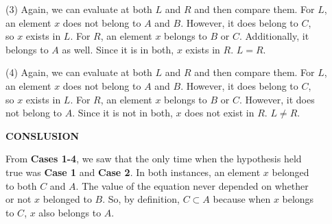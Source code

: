 \documentclass{article}
\begin{document}
\begin{flushleft}
 (3)\:\: Again, we can evaluate at both $L$ and $R$ and then compare them. For $L$, \\
 \qquad an element $x$ does not belong to $A$ and $B$. However, it does belong to $C$, \\
 \qquad so $x$ exists in $L$. For $R$, an element $x$ belongs to $B$ or $C$. Additionally, it  \\
 \qquad belongs to $A$ as well. Since it is in both, $x$ exists in $R$. $L=R$.\\
 \end{flushleft}


\begin{flushleft}
 (4)\:\: Again, we can evaluate at both $L$ and $R$ and then compare them. For $L$, \\
 \qquad an element $x$ does not belong to $A$ and $B$. However, it does belong to $C$, \\
 \qquad so $x$ exists in $L$. For $R$, an element $x$ belongs to $B$ or $C$. However, it does \\
 \qquad not belong to $A$. Since it is not in both, $x$ does not exist in $R$. $L \neq R$.\\
 \end{flushleft}

\begin{flushleft}
\textbf{CONSLUSION}\\
\end{flushleft}

\begin{flushleft}
From \textbf{Cases 1-4}, we saw that the only time when the hypothesis held \\
true was \textbf{Case 1} and \textbf{Case 2}. In both instances, an element $x$ belonged \\
to both $C$ and $A$. The value of the equation never depended on whether \\
or not $x$ belonged to $B$. So, by definition, $C \subset A$ because when $x$ belongs \\
to $C$, $x$ also belongs to $A$. \\
\end{flushleft}

\end{document}
